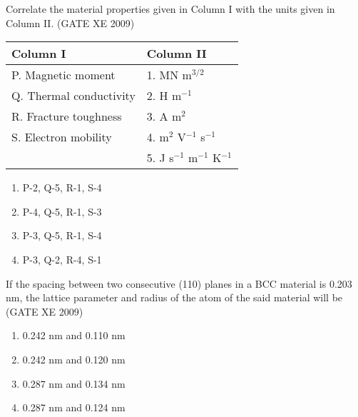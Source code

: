 \iffalse
\chapter{2009}
\author{AI24BTECH11030}
\section{xe}
\fi

    \item Correlate the material properties given in Column I with the units given in Column II. \hfill (GATE XE 2009)

    \begin{table}[h!]
    \centering
    \begin{tabular}{l | l}
    \textbf{Column I}           & \textbf{Column II} \\
    \hline
    P. Magnetic moment          & 1. MN m$^{3/2}$ \\
    Q. Thermal conductivity      & 2. H m$^{-1}$ \\
    R. Fracture toughness        & 3. A m$^{2}$ \\
    S. Electron mobility         & 4. m$^{2}$ V$^{-1}$ s$^{-1}$ \\
                                & 5. J s$^{-1}$ m$^{-1}$ K$^{-1}$ \\
    \end{tabular}
    \end{table}

    \begin{multicols}{2}
        \begin{enumerate}
            \item P-2, Q-5, R-1, S-4
            \item P-4, Q-5, R-1, S-3
            \item P-3, Q-5, R-1, S-4
            \item P-3, Q-2, R-4, S-1
        \end{enumerate}
    \end{multicols}

    \item If the spacing between two consecutive (110) planes in a BCC material is 0.203 nm, the lattice parameter and radius of the atom of the said material will be  \hfill (GATE XE 2009)

    \begin{multicols}{2}
        \begin{enumerate}
            \item 0.242 nm and 0.110 nm
            \item 0.242 nm and 0.120 nm
            \item 0.287 nm and 0.134 nm
            \item 0.287 nm and 0.124 nm
        \end{enumerate}
    \end{multicols}

